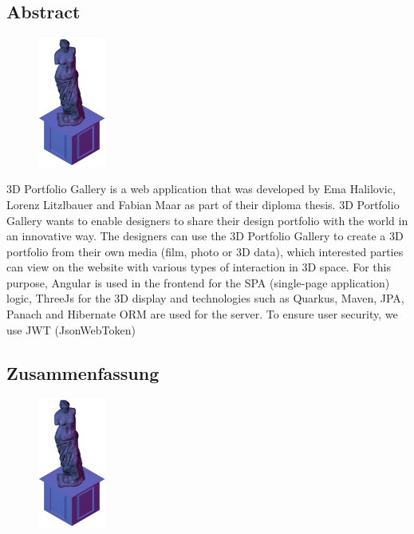 \begin{spacing}{1}
    \chapter*{Abstract}
\end{spacing}
\begin{figure}
    \begin{center}
      \includegraphics[width=0.2\textwidth]{pics/statue.png}
    \end{center}
\end{figure}

3D Portfolio Gallery is a web application that was developed by Ema Halilovic, Lorenz Litzlbauer and Fabian Maar as part of their diploma thesis. 3D Portfolio Gallery wants to enable designers to share their design portfolio with the world in an innovative way. The designers can use the 3D Portfolio Gallery to create a 3D portfolio from their own media (film, photo or 3D data), which interested parties can view on the website with various types of interaction in 3D space.
For this purpose, Angular is used in the frontend for the SPA (single-page application) logic, ThreeJs for the 3D display and technologies such as Quarkus, Maven, JPA, Panach and Hibernate ORM are used for the server.
To ensure user security, we use JWT (JsonWebToken)

\newpage
\begin{spacing}{1}
    \chapter*{Zusammenfassung}
\end{spacing}
\begin{figure}
    \begin{center}
      \includegraphics[width=0.2\textwidth]{pics/statue.png}
    \end{center}
\end{figure}

